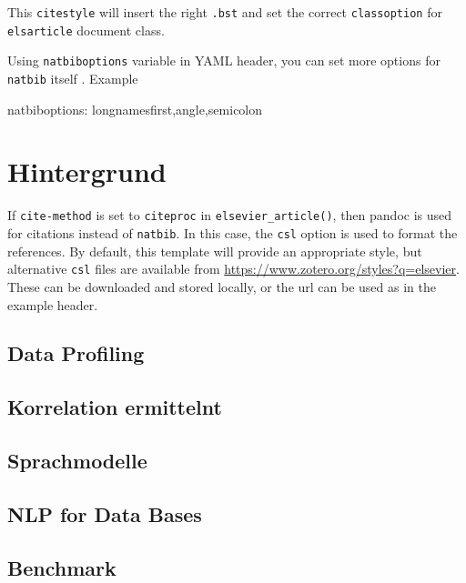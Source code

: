\documentclass[
  authoryear,
  preprint]{elsarticle}
\newenvironment{Shaded}{\begin{snugshade}}{\end{snugshade}}
\newcommand{\AttributeTok}[1]{\textcolor[rgb]{0.40,0.45,0.13}{#1}}
\newcommand{\FunctionTok}[1]{\textcolor[rgb]{0.28,0.35,0.67}{#1}}
\newcommand{\KeywordTok}[1]{\textcolor[rgb]{0.00,0.23,0.31}{#1}}
\begin{document}
This \texttt{citestyle} will insert the right \texttt{.bst} and set the
correct \texttt{classoption} for \texttt{elsarticle} document class.

Using \texttt{natbiboptions} variable in YAML header, you can set more
options for \texttt{natbib} itself . Example

\begin{Shaded}
\begin{Highlighting}[]
\FunctionTok{natbiboptions}\KeywordTok{:}\AttributeTok{ longnamesfirst,angle,semicolon}
\end{Highlighting}
\end{Shaded}

\section{Hintergrund}\label{hintergrund}

If \texttt{cite-method} is set to \texttt{citeproc} in
\texttt{elsevier\_article()}, then pandoc is used for citations instead
of \texttt{natbib}. In this case, the \texttt{csl} option is used to
format the references. By default, this template will provide an
appropriate style, but alternative \texttt{csl} files are available from
\url{https://www.zotero.org/styles?q=elsevier}. These can be downloaded
and stored locally, or the url can be used as in the example header.

\subsection{Data Profiling}\label{data-profiling}

\subsection{Korrelation ermittelnt}\label{korrelation-ermittelnt}

\subsection{Sprachmodelle}\label{sprachmodelle}

\subsection{NLP for Data Bases}\label{nlp-for-data-bases}

\subsection{Benchmark}\label{benchmark}
\end{document}
